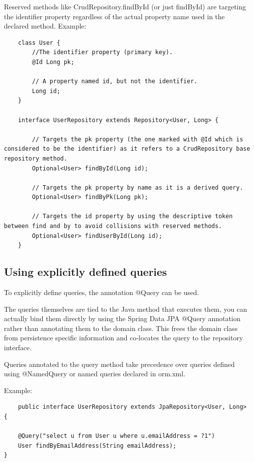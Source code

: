 \documentclass{scrartcl}
\begin{document}
    Reserved methods like CrudRepository.findById (or just findById) are targeting the identifier property regardless of the actual property name used in the declared method.
    Example:

\begin{lstlisting}
    class User {
        //The identifier property (primary key).
        @Id Long pk;

        // A property named id, but not the identifier.
        Long id;
    }

    interface UserRepository extends Repository<User, Long> {

        // Targets the pk property (the one marked with @Id which is considered to be the identifier) as it refers to a CrudRepository base repository method.
        Optional<User> findById(Long id);

        // Targets the pk property by name as it is a derived query.
        Optional<User> findByPk(Long pk);

        // Targets the id property by using the descriptive token between find and by to avoid collisions with reserved methods.
        Optional<User> findUserById(Long id);
    }

\end{lstlisting}

\subsection{Using explicitly defined queries}

To explicitly define queries, the annotation @Query can be used.

The queries themselves are tied to the Java method that executes them, you can actually bind them directly by using the Spring Data JPA @Query annotation rather than annotating them to the domain class. This frees the domain class from persistence specific information and co-locates the query to the repository interface.

Queries annotated to the query method take precedence over queries defined using @NamedQuery or named queries declared in orm.xml.

Example:

\begin{lstlisting}
    public interface UserRepository extends JpaRepository<User, Long> {

    @Query("select u from User u where u.emailAddress = ?1")
    User findByEmailAddress(String emailAddress);
}

\end{lstlisting}
\end{document}
